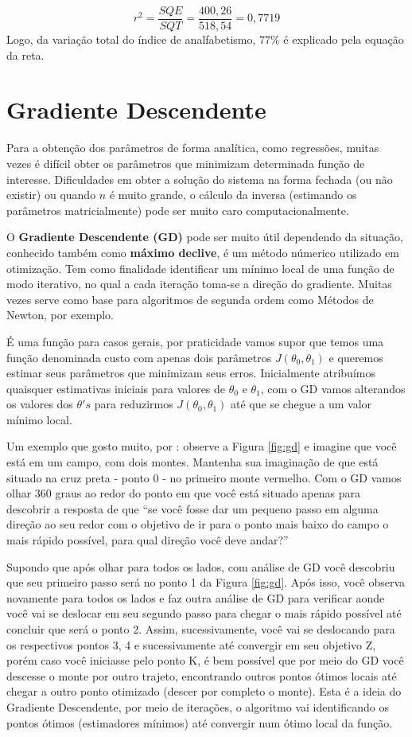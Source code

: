 \documentclass[
  openany]{book}
\begin{document}
\[r^2=\frac{SQE}{SQT}=\frac{400,26}{518,54}=0,7719\]
Logo, da variação total do índice de analfabetismo, 77\% é explicado pela equação da reta.

\hypertarget{GD}{%
\section{Gradiente Descendente}\label{GD}}

Para a obtenção dos parâmetros de forma analítica, como regressões, muitas vezes é difícil obter os parâmetros que minimizam determinada função de interesse. Dificuldades em obter a solução do sistema na forma fechada (ou não existir) ou quando \(n\) é muito grande, o cálculo da inversa (estimando os parâmetros matricialmente) pode ser muito caro computacionalmente.

O \textbf{Gradiente Descendente (GD)} pode ser muito útil dependendo da situação, conhecido também como \textbf{máximo declive}, é um método númerico utilizado em otimização. Tem como finalidade identificar um mínimo local de uma função de modo iterativo, no qual a cada iteração toma-se a direção do gradiente. Muitas vezes serve como base para algoritmos de segunda ordem como Métodos de Newton, por exemplo.

É uma função para casos gerais, por praticidade vamos supor que temos uma função denominada custo com apenas dois parâmetros \(J(\theta_0,\theta_1)\) e queremos estimar seus parâmetros que minimizam seus erros. Inicialmente atribuímos quaisquer estimativas iniciais para valores de \(\theta_0\) e \(\theta_1\), com o GD vamos alterandos os valores dos \(\theta's\) para reduzirmos \(J(\theta_0,\theta_1)\) até que se chegue a um valor mínimo local.

Um exemplo que gosto muito, por \citet{andrewcoursera}: observe a Figura \ref{fig:gd} e imagine que você está em um campo, com dois montes. Mantenha sua imaginação de que está situado na cruz preta - ponto 0 - no primeiro monte vermelho. Com o GD vamos olhar 360 graus ao redor do ponto em que você está situado apenas para descobrir a resposta de que ``se você fosse dar um pequeno passo em alguma direção ao seu redor com o objetivo de ir para o ponto mais baixo do campo o mais rápido possível, para qual direção você deve andar?''

Supondo que após olhar para todos os lados, com análise de GD você descobriu que seu primeiro passo será no ponto 1 da Figura \ref{fig:gd}. Após isso, você observa novamente para todos os lados e faz outra análise de GD para verificar aonde você vai se deslocar em seu segundo passo para chegar o mais rápido possível até concluir que será o ponto 2. Assim, sucessivamente, você vai se deslocando para os respectivos pontos 3, 4 e sucessivamente até convergir em seu objetivo Z, porém caso você iniciasse pelo ponto K, é bem possível que por meio do GD você descesse o monte por outro trajeto, encontrando outros pontos ótimos locais até chegar a outro ponto otimizado (descer por completo o monte). Esta é a ideia do Gradiente Descendente, por meio de iterações, o algoritmo vai identificando os pontos ótimos (estimadores mínimos) até convergir num ótimo local da função.
\end{document}
